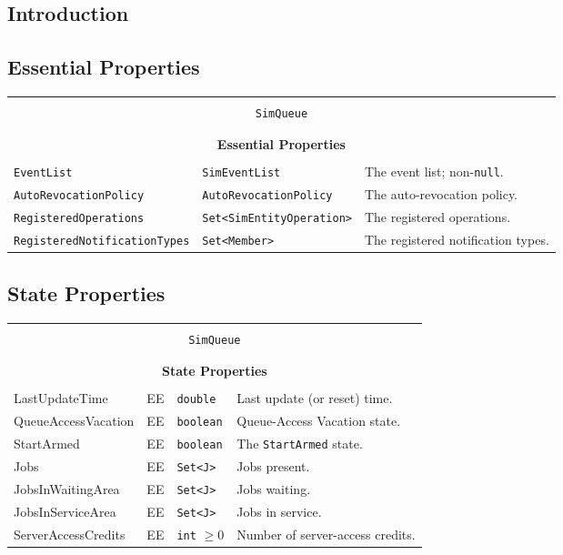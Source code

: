 \documentclass[12pt]{book}
\begin{document}
\subsection{Introduction}

\subsection{Essential Properties}

\begin{tabular}{|l|l|l|}
\hline
\multicolumn{3}{|c|}{} \\
\multicolumn{3}{|c|}{\lstinline[basicstyle=\large]{SimQueue}} \\
\multicolumn{3}{|c|}{} \\
\hline
\multicolumn{3}{|c|}{} \\
\multicolumn{3}{|c|}{\bf Essential Properties} \\
\multicolumn{3}{|c|}{} \\
\hline
\lstinline|EventList| & \lstinline|SimEventList| & The event list; non-\lstinline|null|. \\
\hline
\lstinline|AutoRevocationPolicy| & \lstinline|AutoRevocationPolicy| & The auto-revocation policy. \\
\hline
\lstinline|RegisteredOperations| & \lstinline|Set<SimEntityOperation>| & The registered operations. \\
\hline
\lstinline|RegisteredNotificationTypes| & \lstinline|Set<Member>| & The registered notification types. \\
\hline
\end{tabular}

\subsection{State Properties}

\begin{tabular}{|l|l|l|l|}
\hline
\multicolumn{4}{|c|}{} \\
\multicolumn{4}{|c|}{\lstinline[basicstyle=\large]{SimQueue}} \\
\multicolumn{4}{|c|}{} \\
\hline
\multicolumn{4}{|c|}{} \\
\multicolumn{4}{|c|}{\bf State Properties} \\
\multicolumn{4}{|c|}{} \\
\hline
LastUpdateTime & EE & \lstinline|double| & Last update (or reset) time. \\
\hline
QueueAccessVacation & EE & \lstinline|boolean| & Queue-Access Vacation state. \\
\hline
StartArmed & EE & \lstinline|boolean| & The \lstinline|StartArmed| state. \\
\hline
Jobs & EE & \lstinline|Set<J>| & Jobs present. \\
\hline
JobsInWaitingArea & EE & \lstinline|Set<J>| & Jobs waiting. \\
\hline
JobsInServiceArea & EE & \lstinline|Set<J>| & Jobs in service. \\
\hline
ServerAccessCredits & EE & \lstinline|int| $\geq 0$ & Number of server-access credits. \\
\hline
\end{tabular}
\end{document}
